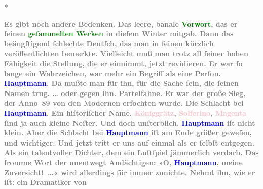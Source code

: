 \pstart
           \centering{}\textcolor{gray}{\textbf{*}}\pend
           
\pstart
           \noindent{}\textcolor{gray}{\textbf{Es gibt noch andere Bedenken. Das leere, banale \textcolor{green}{Vorwort}{}\ledrightnote{{$\rightarrow$}\textcolor{green}{Geleitsworte}}, das er
                  ſeinen \textcolor{green}{geſammelten Werken}{}\ledrightnote{\textcolor{green}{Gesammelte Werke in sechs Bänden}} in dieſem Winter
                  mitgab. Dann das beängſtigend ſchlechte Deutſch, das man in ſeinen kürzlich
                  veröffentlichten \label{K_L03438-6v}\label{K_L03438-6h} bemerkte.
                  Vielleicht muß man trotz all ſeiner hohen Fähigkeit die Stellung, die er einnimmt,
                  jetzt revidieren. Er war ſo lange ein Wahrzeichen, war mehr ein Begriff als eine
                  Perſon. \textcolor{blue}{Hauptmann}{}\ledrightnote{\textcolor{blue}{Gerhart Hauptmann}}. Da mußte man für ihn,
                  für die Sache ſein, die ſeinen Namen trug. \textsc{\label{K_L03438-7v}\label{K_L03438-7h}}{ }{\dots} oder gegen ihn. Parteifahne. Er war der große Sieg,
                  der Anno 89 von den Modernen erfochten wurde. Die Schlacht bei \textcolor{blue}{Hauptmann}{}\ledrightnote{\textcolor{blue}{Gerhart Hauptmann}}. Ein hiſtoriſcher Name. \textcolor{pink}{Königgrätz}{}\ledrightnote{\textcolor{pink}{Hradec Králové}}, \textcolor{pink}{Solferino}{}\ledrightnote{\textcolor{pink}{Solferino}},
                     \textcolor{pink}{Magenta}{}\ledrightnote{\textcolor{pink}{Magenta}} ſind ja auch kleine Neſter. Und
                  doch unſterblich. \textcolor{blue}{Hauptmann}{}\ledrightnote{\textcolor{blue}{Gerhart Hauptmann}} iſt nicht
                  klein. Aber die Schlacht bei \textcolor{blue}{Hauptmann}{}\ledrightnote{\textcolor{blue}{Gerhart Hauptmann}} iſt
                  am Ende größer geweſen, und wichtiger. Und jetzt tritt er uns auf einmal als er
                  ſelbſt entgegen. Als ein talentvoller Dichter, dem ein Luſtſpiel jämmerlich
                  verdarb. Das fromme Wort der unentwegt Andächtigen: »O, \textcolor{blue}{Hauptmann}{}\ledrightnote{\textcolor{blue}{Gerhart Hauptmann}}, meine Zuversicht! {\dots}«
                  wird allerdings für immer zunichte. Nehmt ihn, wie er iſt: ein Dramatiker von
}}
